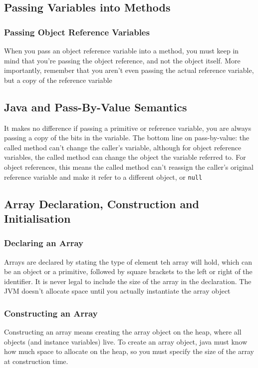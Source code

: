 \subsection{Passing Variables into Methods}
\subsubsection{Passing Object Reference Variables}
When you pass an object reference variable into a method, you must keep in mind 
that you're passing the object reference, and not the object itself. More 
importantly, remember that you aren't even passing the actual reference 
variable, but a copy of the reference variable

\subsection{Java and Pass-By-Value Semantics}
It makes no difference if passing a primitive or reference variable, you are 
always passing a copy of the bits in the variable. The bottom line on 
pass-by-value: the called method can't change the caller's variable, although 
for object reference variables, the called method can change the object the 
    variable referred to. For object references, this means the called method 
    can't reassign the caller's original reference variable and make it refer 
    to a different object, or \verb#null#

\subsection{Array Declaration, Construction and Initialisation}
\subsubsection{Declaring an Array}
Arrays are declared by stating the type of element teh array will hold, which 
can be an object or a primitive, followed by square brackets to the left or 
right of the identifier. It is never legal to include the size of the array in 
the declaration. The JVM doesn't allocate space until you actually instantiate 
the array object

\subsubsection{Constructing an Array}
Constructing an array means creating the array object on the heap, where all 
objects (and instance variables) live. To create an array object, java must 
know how much space to allocate on the heap, so you must specify the size of 
the array at construction time.

